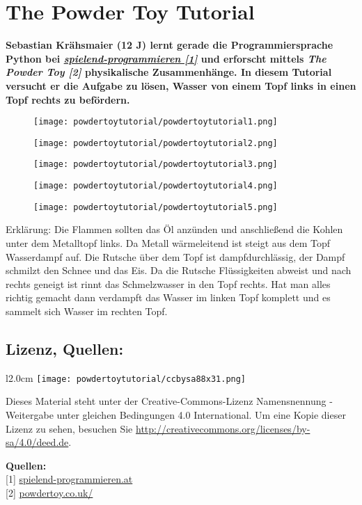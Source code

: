 \section*{The Powder Toy Tutorial}
\hypertarget{powdertoytutorial}{}
\label{powdertoytutorial}

\textbf{Sebastian Krähsmaier (12 J) lernt gerade die Programmiersprache Python bei \href{http://spielend-programmieren.at}{\textit{spielend-programmieren [1]}} und erforscht mittels \textit{The Powder Toy [2]} physikalische Zusammenhänge. In diesem Tutorial versucht er die Aufgabe zu lösen, Wasser von einem Topf links in einen Topf rechts zu befördern.}

\begin{figure}
\texttt{[image: powdertoytutorial/powdertoytutorial1.png]}
\end{figure}

\begin{figure}
\texttt{[image: powdertoytutorial/powdertoytutorial2.png]}
\end{figure}

\begin{figure}
\texttt{[image: powdertoytutorial/powdertoytutorial3.png]}
\end{figure}

\begin{figure}
\texttt{[image: powdertoytutorial/powdertoytutorial4.png]}
\end{figure}

\begin{figure}
\texttt{[image: powdertoytutorial/powdertoytutorial5.png]}
\end{figure}

Erklärung: Die Flammen sollten das Öl anzünden und anschließend die Kohlen unter dem Metalltopf links. Da Metall wärmeleitend ist steigt aus dem Topf Wasserdampf auf. Die Rutsche über dem Topf ist dampfdurchlässig, der Dampf schmilzt den Schnee und das Eis. Da die Rutsche Flüssigkeiten abweist und nach rechts geneigt ist rinnt das Schmelzwasser in den Topf rechts. Hat man alles richtig gemacht dann verdampft das Wasser im linken Topf komplett und es sammelt sich Wasser im rechten Topf.

\subsection*{Lizenz, Quellen:}
\begin{wrapfigure}{l}{2.0cm}
\texttt{[image: powdertoytutorial/ccbysa88x31.png]}
\end{wrapfigure}
Dieses Material steht unter der Creative-Commons-Lizenz Namensnennung - Weitergabe unter gleichen Bedingungen 4.0 International. Um eine Kopie dieser Lizenz zu sehen, besuchen Sie \url{http://creativecommons.org/licenses/by-sa/4.0/deed.de}.

\textbf{Quellen:} \\
{[}1{]} \href{http://spielend-programmieren.at}{spielend-programmieren.at} \\
{[}2{]} \href{http://powdertoy.co.uk/}{powdertoy.co.uk/} \\
